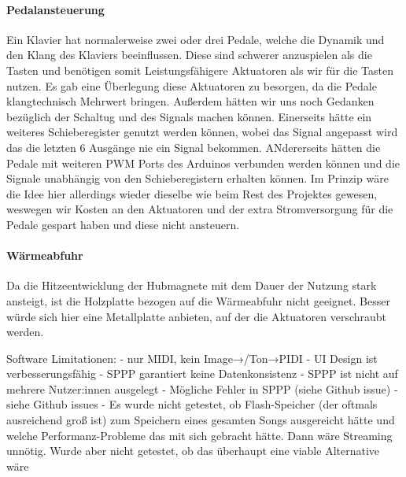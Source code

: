 \paragraph{Pedalansteuerung}
Ein Klavier hat normalerweise zwei oder drei Pedale, welche die Dynamik und den Klang des Klaviers beeinflussen.
Diese sind schwerer anzuspielen als die Tasten und benötigen somit Leistungsfähigere Aktuatoren als wir für die Tasten nutzen.
Es gab eine Überlegung diese Aktuatoren zu besorgen, da die Pedale klangtechnisch Mehrwert bringen.
Außerdem hätten wir uns noch Gedanken bezüglich der Schaltug und des Signals machen können.
Einerseits hätte ein weiteres Schieberegister genutzt werden können, wobei das Signal angepasst wird das die letzten 6 Ausgänge nie ein Signal bekommen.
ANdererseits hätten die Pedale mit weiteren \ac{PWM} Ports des Arduinos verbunden werden können und die Signale unabhängig von den
Schieberegistern erhalten können.
Im Prinzip wäre die Idee hier allerdings wieder dieselbe wie beim Rest des Projektes gewesen,
weswegen wir Kosten an den Aktuatoren und der extra Stromversorgung für die Pedale gespart haben und diese nicht ansteuern.

\paragraph{Wärmeabfuhr}
Da die Hitzeentwicklung der Hubmagnete mit dem Dauer der Nutzung stark ansteigt, ist die Holzplatte bezogen auf die Wärmeabfuhr nicht geeignet.
Besser würde sich hier eine Metallplatte anbieten, auf der die Aktuatoren verschraubt werden.


Software Limitationen: \newline
- nur MIDI, kein Image→/Ton→PIDI \newline
- UI Design ist verbesserungsfähig \newline
- SPPP garantiert keine Datenkonsistenz \newline
- SPPP ist nicht auf mehrere Nutzer:innen ausgelegt \newline
- Mögliche Fehler in SPPP (siehe Github issue) \newline
- siehe Github issues \newline
- Es wurde nicht getestet, ob Flash-Speicher (der oftmals ausreichend groß ist) zum Speichern eines gesamten Songs ausgereicht hätte und welche Performanz-Probleme das mit sich gebracht hätte. Dann wäre Streaming unnötig. Wurde aber nicht getestet, ob das überhaupt eine viable Alternative wäre \newline
